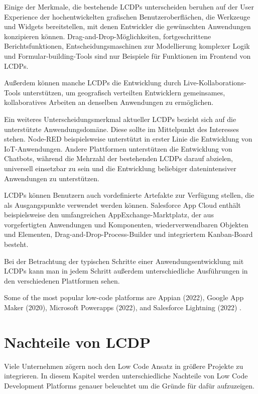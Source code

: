 \documentclass[12pt]{article} %
\begin{document}
	Einige der Merkmale, die bestehende LCDPs unterscheiden beruhen auf der User Experience der hochentwickelten grafischen Benutzeroberflächen, die Werkzeuge und Widgets bereitstellen, mit denen Entwickler die gewünschten Anwendungen konzipieren können. Drag-and-Drop-Möglichkeiten, fortgeschrittene Berichtsfunktionen, Entscheidungsmaschinen zur Modellierung komplexer Logik und Formular-building-Tools sind nur Beispiele für Funktionen im Frontend von LCDPs. \cite{DiRuscio.2022}
	
	Außerdem können manche LCDPs die Entwicklung durch Live-Kollaborations-Tools unterstützen, um geografisch verteilten Entwicklern gemeinsames, kollaboratives Arbeiten an denselben Anwendungen zu ermöglichen. \cite{DiRuscio.2022}
	
	Ein weiteres Unterscheidungsmerkmal aktueller LCDPs bezieht sich auf die unterstützte Anwendungsdomäne. Diese sollte im Mittelpunkt des Interesses stehen. Node-RED beispielsweise unterstützt in erster Linie die Entwicklung von IoT-Anwendungen. Andere Plattformen unterstützen die Entwicklung von Chatbots, während die Mehrzahl der bestehenden LCDPs darauf abzielen, universell einsetzbar zu sein und die Entwicklung beliebiger datenintensiver Anwendungen zu unterstützen. \cite{DiRuscio.2022}
	
	LCDPs können Benutzern auch vordefinierte Artefakte zur Verfügung stellen, die als Ausgangspunkte verwendet werden können. Salesforce App Cloud enthält beispielsweise den umfangreichen AppExchange-Marktplatz, der aus vorgefertigten Anwendungen und Komponenten, wiederverwendbaren Objekten und Elementen, Drag-and-Drop-Process-Builder und integriertem Kanban-Board besteht. \cite{DiRuscio.2022}
	
	Bei der Betrachtung der typischen Schritte einer Anwendungsentwicklung mit LCDPs kann man in jedem Schritt außerdem unterschiedliche Ausführungen in den verschiedenen Plattformen sehen. 
	
	Some of the most popular low-code platforms are Appian (2022), Google App Maker (2020), Microsoft Powerapps (2022), and Salesforce Lightning (2022) \cite{Alamin.2023}.
	
	\section{Nachteile von LCDP}
	Viele Unternehmen zögern noch den Low Code Ansatz in größere Projekte zu integrieren. %
	In diesem Kapitel werden unterschiedliche Nachteile von Low Code Development Platforms genauer beleuchtet um die Gründe für dafür aufzuzeigen.
			
\end{document}
